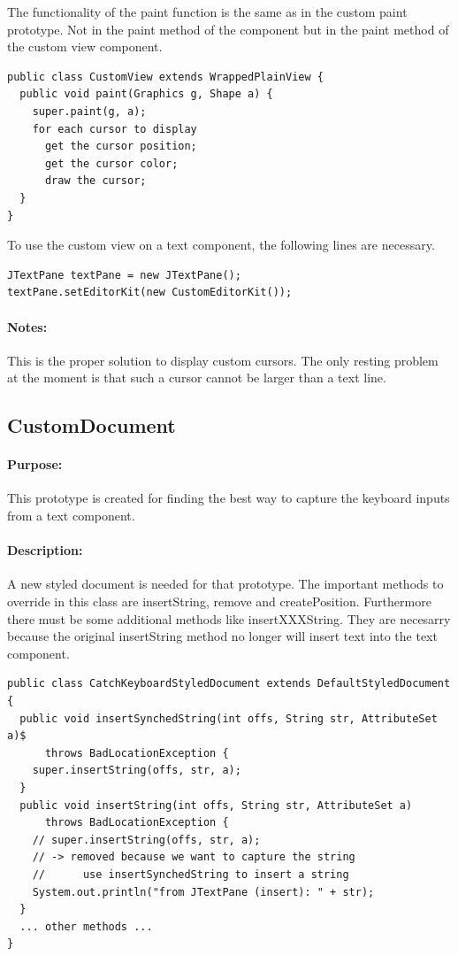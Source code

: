 \documentclass[11pt,a4paper]{article}
\begin{document}
The functionality of the paint function is the same as in the custom paint prototype. Not in the paint method of the component but in the paint method of the custom view component.
\begin{verbatim}
public class CustomView extends WrappedPlainView {
  public void paint(Graphics g, Shape a) {
    super.paint(g, a);
    for each cursor to display
      get the cursor position;
      get the cursor color;
      draw the cursor;
  }
}
\end{verbatim}

To use the custom view on a text component, the following lines are necessary.
\begin{verbatim}
JTextPane textPane = new JTextPane();
textPane.setEditorKit(new CustomEditorKit());
\end{verbatim}

\paragraph{Notes:}
This is the proper solution to display custom cursors. The only resting problem at the moment is that such a cursor cannot be larger than a text line.




\subsection{CustomDocument}
\paragraph{Purpose:}
This prototype is created for finding the best way to capture the keyboard inputs from a text component.
\paragraph{Description:}
A new styled document is needed for that prototype. The important methods to override in this class are insertString, remove and createPosition. Furthermore there must be some additional methods like insertXXXString. They are necesarry because the original insertString method no longer will insert text into the text component.
\begin{verbatim}
public class CatchKeyboardStyledDocument extends DefaultStyledDocument {
  public void insertSynchedString(int offs, String str, AttributeSet a)$
      throws BadLocationException {
    super.insertString(offs, str, a);
  }
  public void insertString(int offs, String str, AttributeSet a)
      throws BadLocationException {
    // super.insertString(offs, str, a);
    // -> removed because we want to capture the string
    //      use insertSynchedString to insert a string
    System.out.println("from JTextPane (insert): " + str);
  }
  ... other methods ...
}\end{verbatim}
\end{document}
